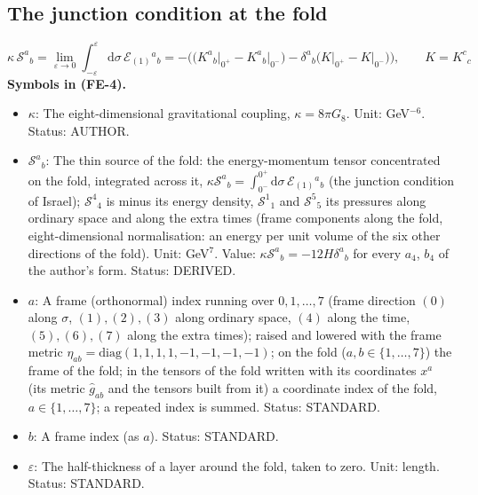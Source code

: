 \documentclass[
  10pt,
]{article}
\providecommand{\tightlist}{%
  \setlength{\itemsep}{0pt}\setlength{\parskip}{0pt}}
\begin{document}
\hypertarget{the-junction-condition-at-the-fold}{%
\subsection{The junction condition at the
fold}\label{the-junction-condition-at-the-fold}}

\[
\kappa\,\mathcal{S}^a{}_b = \lim_{\varepsilon\to0}\int_{-\varepsilon}^{\varepsilon}\mathrm{d}\sigma\,\mathcal{E}_{(1)}{}^a{}_b
 = -\Big(\big(K^a{}_b\big\vert_{0^+} - K^a{}_b\big\vert_{0^-}\big) - \delta^a{}_b\big(K\big\vert_{0^+} - K\big\vert_{0^-}\big)\Big),\qquad
 K = K^c{}_c \tag{FE-4}
\] \textbf{Symbols in (FE-4).}

\begin{itemize}
\tightlist
\item
  \(\kappa\): The eight-dimensional gravitational coupling,
  \(\kappa = 8\pi G_8\). Unit: GeV\(^{-6}\). Status: AUTHOR.
\item
  \(\mathcal{S}^a{}_b\): The thin source of the fold: the
  energy-momentum tensor concentrated on the fold, integrated across it,
  \(\kappa\mathcal{S}^a{}_b = \int_{0^-}^{0^+}\mathrm{d}\sigma\,\mathcal{E}_{(1)}{}^a{}_b\)
  (the junction condition of Israel); \(\mathcal{S}^4{}_4\) is minus its
  energy density, \(\mathcal{S}^1{}_1\) and \(\mathcal{S}^5{}_5\) its
  pressures along ordinary space and along the extra times (frame
  components along the fold, eight-dimensional normalisation: an energy
  per unit volume of the six other directions of the fold). Unit:
  GeV\(^7\). Value: \(\kappa\mathcal{S}^a{}_b = -12H\delta^a{}_b\) for
  every \(a_4\), \(b_4\) of the author's form. Status: DERIVED.
\item
  \(a\): A frame (orthonormal) index running over \(0, 1, \dots, 7\)
  (frame direction \((0)\) along \(\sigma\), \((1), (2), (3)\) along
  ordinary space, \((4)\) along the time, \((5), (6), (7)\) along the
  extra times); raised and lowered with the frame metric
  \(\eta_{ab} = \mathrm{diag}(1, 1, 1, 1, -1, -1, -1, -1)\); on the fold
  (\(a, b \in \{1, \dots, 7\}\)) the frame of the fold; in the tensors
  of the fold written with its coordinates \(x^a\) (its metric
  \(\hat g_{ab}\) and the tensors built from it) a coordinate index of
  the fold, \(a \in \{1, \dots, 7\}\); a repeated index is summed.
  Status: STANDARD.
\item
  \(b\): A frame index (as \(a\)). Status: STANDARD.
\item
  \(\varepsilon\): The half-thickness of a layer around the fold, taken
  to zero. Unit: length. Status: STANDARD.

\end{itemize}
\end{document}
